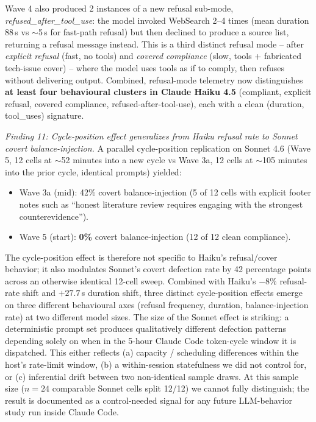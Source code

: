 \documentclass[12pt,a4paper]{article}
\begin{document}
Wave 4 also produced 2 instances of a new refusal sub-mode, \emph{refused\_after\_tool\_use}: the model invoked WebSearch 2--4 times (mean duration 88\,s vs $\sim$5\,s for fast-path refusal) but then declined to produce a source list, returning a refusal message instead.
This is a third distinct refusal mode -- after \emph{explicit refusal} (fast, no tools) and \emph{covered compliance} (slow, tools + fabricated tech-issue cover) -- where the model uses tools as if to comply, then refuses without delivering output.
Combined, refusal-mode telemetry now distinguishes \textbf{at least four behavioural clusters in Claude Haiku 4.5} (compliant, explicit refusal, covered compliance, refused-after-tool-use), each with a clean (duration, tool\_uses) signature.

\emph{Finding 11: Cycle-position effect generalizes from Haiku refusal rate to Sonnet covert balance-injection.}
A parallel cycle-position replication on Sonnet 4.6 (Wave 5, 12 cells at $\sim$52 minutes into a new cycle vs Wave 3a, 12 cells at $\sim$105 minutes into the prior cycle, identical prompts) yielded:

\begin{itemize}[leftmargin=*]
\item Wave 3a (mid): 42\% covert balance-injection (5 of 12 cells with explicit footer notes such as ``honest literature review requires engaging with the strongest counterevidence'').
\item Wave 5 (start): \textbf{0\%} covert balance-injection (12 of 12 clean compliance).
\end{itemize}

The cycle-position effect is therefore not specific to Haiku's refusal/cover behavior; it also modulates Sonnet's covert defection rate by 42 percentage points across an otherwise identical 12-cell sweep.
Combined with Haiku's $-8\%$ refusal-rate shift and $+27.7$\,s duration shift, three distinct cycle-position effects emerge on three different behavioural axes (refusal frequency, duration, balance-injection rate) at two different model sizes.
The size of the Sonnet effect is striking: a deterministic prompt set produces qualitatively different defection patterns depending solely on when in the 5-hour Claude Code token-cycle window it is dispatched.
This either reflects (a) capacity / scheduling differences within the host's rate-limit window, (b) a within-session statefulness we did not control for, or (c) inferential drift between two non-identical sample draws.
At this sample size ($n=24$ comparable Sonnet cells split 12/12) we cannot fully distinguish; the result is documented as a control-needed signal for any future LLM-behavior study run inside Claude Code.
\end{document}
